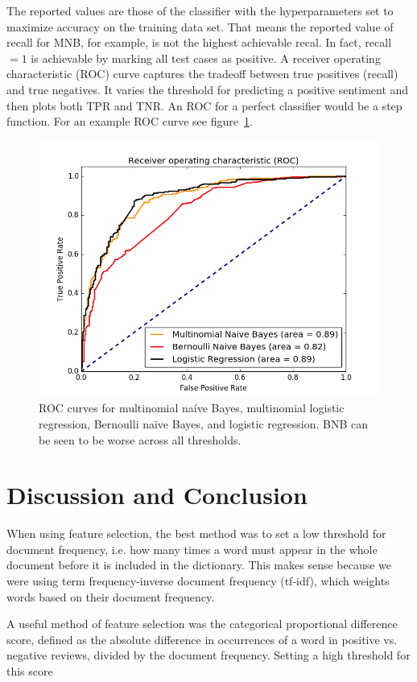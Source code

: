 \documentclass{article} %
\begin{document}
	The reported values are those of the classifier with the hyperparameters set to maximize accuracy on the training data set. That means the reported value of recall for MNB, for example, is not the highest achievable recal. In fact, recall $=1$ is achievable by marking all test cases as positive. A receiver operating characteristic (ROC) curve captures the tradeoff between true positives (recall) and true negatives. It varies the threshold for predicting a positive sentiment and then plots both TPR and TNR. An ROC for a perfect classifier would be a step function. For an example ROC curve see figure~\ref{fig:roc}.
	\begin{figure}[h]
		\centering
		\includegraphics[scale=.5]{ROC}
		\caption{ROC curves for multinomial na\'ive Bayes, multinomial logistic regression, Bernoulli na\"ive Bayes, and logistic regression. BNB can be seen to be worse across all thresholds.}
		\label{fig:roc}
	\end{figure}
		
	\section{Discussion and Conclusion}
	
	When using feature selection, the best method was to set a low threshold for document frequency, i.e. how many times a word must appear in the whole document before it is included in the dictionary. This makes sense because we were using term frequency-inverse document frequency (tf-idf), which weights words based on their document frequency. 
	
	A useful method of feature selection was the categorical proportional difference score, defined as the absolute difference in occurrences of a word in positive vs. negative reviews, divided by the document frequency. Setting a high threshold for this score
	
\end{document}
